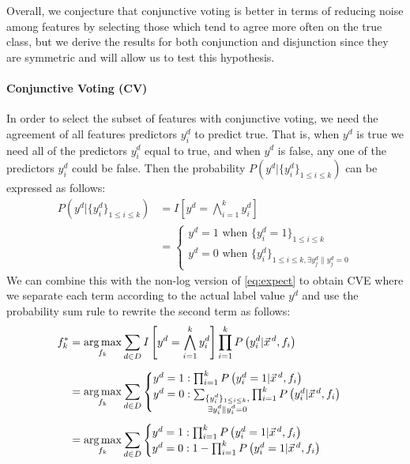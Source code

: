 Overall, we conjecture that conjunctive voting is better in terms of
reducing noise among features by selecting those which tend to agree
more often on the true class, but we derive the results for both
conjunction and disjunction since they are symmetric and will allow us
to test this hypothesis.

\paragraph{Conjunctive Voting (CV)}
In order to select the subset of features with conjunctive voting, 
we need the agreement of all features predictors
$y^d_i$ to predict true. That is, when $y^d$ is true we need all of
the predictors $y^d_i$ equal to true, and when $y^d$ is false, any 
one of the predictors $y^d_i$ could be false. Then the
probability $P\left(y^d|\{y^d_i\}_{1\leq i\leq k}\right)$ can be
expressed as follows:
{\small 
\begin{align}
P\left(y^d|\{y^d_i\}_{1\leq i\leq k}\right) & =I\left[y^d=\bigwedge_{i=1}^k y^d_i\right] \nonumber\\
&= \begin{cases}
	y^d=1 \text{ when } \{y_i^d=1\}_{1\leq i\leq k}\\
	y^d=0 \text{ when } \{y_i^d\}_{1\leq i\leq k,\exists{y_j^d\|y_j^d=0}}
\end{cases}\label{eq:expect_pre_1}
\end{align}}
We can combine this with the non-log version of \eqref{eq:expect} to
obtain CVE where we  
separate each term according to the actual
label value $y^d$ and use the probability sum rule to rewrite the
second term as follows:
\begin{align}
f_k^*&=\argmax_{f_k}\sum_{d\in D}I\left[y^d=\bigwedge_{i=1}^k y^d_i\right]\prod_{i=1}^kP\left(y_i^d|\vec{x}^{\,d},f_i\right)\nonumber\\[0.5em]
&=\argmax_{f_k}\sum_{d\in D}
\begin{cases}
	y^d=1: \prod_{i=1}^kP\left(y_i^d=1|\vec{x}^{\,d},f_i\right)\\
	y^d=0: \sum_{\substack{\{y_i^d\}_{1\leq i\leq k},\\ \exists{y_i^d\|y_i^d=0}}}\prod_{i=1}^kP\left(y_i^d|\vec{x}^{\,d},f_i\right)
\end{cases}\nonumber\\[0.5em]
&=\argmax_{f_k}\sum_{d\in D}
\begin{cases}
	y^d=1: \prod_{i=1}^kP\left(y_i^d = 1|\vec{x}^{\,d},f_i\right)\\
	y^d=0: 1-\prod_{i=1}^kP\left(y_i^d = 1|\vec{x}^{\,d},f_i\right)
\end{cases}\label{eq:expect_pre_2}%
\end{align}
